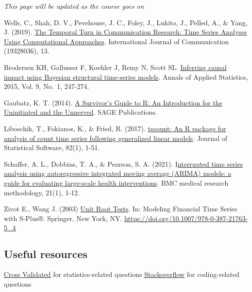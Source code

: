 \documentclass[
]{article}
\begin{document}
\emph{This page will be updated as the course goes on}

Wells, C., Shah, D. V., Pevehouse, J. C., Foley, J., Lukito, J., Pelled, A., \& Yang, J. (2019). \href{https://ijoc.org/index.php/ijoc/article/view/10635}{The Temporal Turn in Communication Research: Time Series Analyses Using Computational Approaches}. International Journal of Communication (19328036), 13.

Brodersen KH, Gallusser F, Koehler J, Remy N, Scott SL. \href{http://research.google.com/pubs/pub41854.html}{Inferring causal impact using Bayesian structural time-series models}. Annals of Applied Statistics, 2015, Vol. 9, No.~1, 247-274.

Gaubatz, K. T. (2014). \href{https://methods.sagepub.com/Book/a-survivors-guide-to-r}{A Survivor's Guide to R: An Introduction for the Uninitiated and the Unnerved}. SAGE Publications.

Liboschik, T., Fokianos, K., \& Fried, R. (2017). \href{https://cran.r-project.org/web/packages/tscount/vignettes/tsglm.pdf}{tscount: An R package for analysis of count time series following generalized linear models}. Journal of Statistical Software, 82(1), 1-51.

Schaffer, A. L., Dobbins, T. A., \& Pearson, S. A. (2021). I\href{https://bmcmedresmethodol.biomedcentral.com/articles/10.1186/s12874-021-01235-8}{nterrupted time series analysis using autoregressive integrated moving average (ARIMA) models: a guide for evaluating large-scale health interventions}. BMC medical research methodology, 21(1), 1-12.

Zivot E., Wang J. (2003) \href{https://faculty.washington.edu/ezivot/econ584/notes/unitroot.pdf}{Unit Root Tests}. In: Modeling Financial Time Series with S-Plus®. Springer, New York, NY. \url{https://doi.org/10.1007/978-0-387-21763-5_4}

\hypertarget{useful-resources}{%
\subsection{Useful resources}\label{useful-resources}}

\href{https://stats.stackexchange.com}{Cross Validated} for statistics-related questions
\href{https://stackoverflow.com/questions}{Stackoverflow} for coding-related questions
\end{document}
